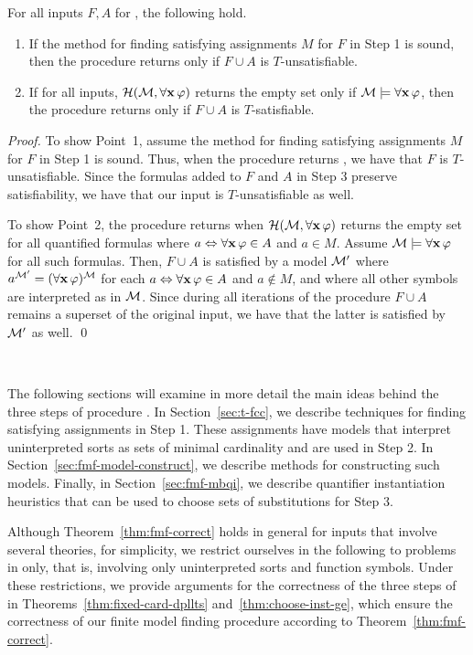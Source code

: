 \documentclass{svjour3}                     %
\begin{document}
\begin{thm}
\label{thm:fmf-correct}
For all inputs $F,A$ for \fmsolve, the following hold.
\begin{enumerate}
\item If the method for finding satisfying assignments $M$ for $F$ in Step 1 is sound, then the procedure \fmsolve returns \unsat only if $F \cup A$ is $T$-unsatisfiable.
\item If for all inputs, $\mathcal{H}( \mathcal{M}, \forall \mathbf{x}\,\varphi )$ returns the empty set only if $\mathcal{M} \models \forall \mathbf{x}\,\varphi$, then the procedure \fmsolve 
returns \sat only if $F \cup A$ is $T$-satisfiable.
\end{enumerate}
\end{thm}
\begin{proof}
To show Point~1, assume the method for finding satisfying assignments $M$ for $F$ in Step 1 is sound.
Thus, when the procedure returns \unsat, we have that $F$ is $T$-unsatisfiable.
Since the formulas added to $F$ and $A$ in Step 3 preserve satisfiability, we have that our input is $T$-unsatisfiable as well.

To show Point~2,
the procedure returns \sat when $\mathcal{H}( \mathcal{M}, \forall \mathbf{x}\,\varphi )$ returns
the empty set for all quantified formulas where $a \Leftrightarrow \forall \mathbf{x}\,\varphi \in A$ and $a \in M$.
Assume $\mathcal{M} \models \forall \mathbf{x}\,\varphi$ for all such formulas.
Then, $F \cup A$ is satisfied by a model $\mathcal{M}'$ where
$a^{\mathcal{M}'} = (\forall \mathbf{x}\,\varphi)^{\mathcal{M}}$ for each $a \Leftrightarrow \forall \mathbf{x}\,\varphi \in A$ and $a \not\in M$,
and where all other symbols are interpreted as in $\mathcal{M}$.
Since during all iterations of the procedure $F \cup A$ remains a superset of 
the original input, we have that the latter is satisfied by $\mathcal{M}'$ as well.
\qed
\end{proof}

\ 

The following sections will examine in more detail the main ideas
behind the three steps of procedure \fmsolve.
In Section~\ref{sec:t-fcc}, we describe techniques 
for finding satisfying assignments in Step 1.
These assignments have models that interpret uninterpreted sorts as sets of minimal cardinality
and are used in Step 2.
In Section~\ref{sec:fmf-model-construct}, we describe methods for constructing such models.
Finally, in Section~\ref{sec:fmf-mbqi}, we describe quantifier instantiation heuristics 
that can be used to choose sets of substitutions for Step 3.

Although Theorem~\ref{thm:fmf-correct} holds in general for inputs that involve
several theories, for simplicity, we restrict ourselves in the following
to problems in \euf only, that is, involving only uninterpreted sorts and function symbols.
Under these restrictions,
we provide arguments for the correctness of the three steps of \fmsolve in
Theorems~\ref{thm:fixed-card-dpllts} and~\ref{thm:choose-inst-ge},
which ensure the correctness of our finite model finding procedure 
according to Theorem~\ref{thm:fmf-correct}.
\end{document}
